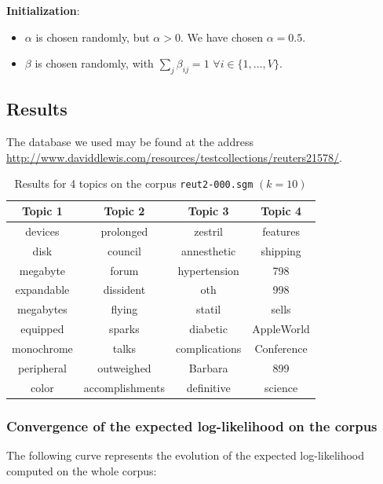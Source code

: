 \documentclass{article}
\begin{document}
\textbf{Initialization}:
\begin{itemize}
\setlength\itemsep{-0.2em}
  \item $\alpha$ is chosen randomly, but $\alpha > 0$. We have chosen $\alpha = 0.5$.
  \item $\beta$ is chosen randomly, with $\sum_{j} \beta_{ij} = 1$ $\forall i \in \{1, \ldots, V\}$.
\end{itemize}

\subsection{Results}

The database we used may be found at the address \url{http://www.daviddlewis.com/resources/testcollections/reuters21578/}.

\begin{table}[ht!]
\begin{center}
\begin{tabular}{c c c c}
\hline
\textbf{Topic 1} & \textbf{Topic 2} & \textbf{Topic 3}  & \textbf{Topic 4}\\
\hline
devices & prolonged & zestril & features \\
disk & council & annesthetic &  shipping  \\
megabyte & forum & hypertension & 798  \\
expandable & dissident & oth & 998  \\
megabytes & flying & statil & sells  \\
equipped &  sparks & diabetic & AppleWorld  \\
monochrome &talks & complications & Conference  \\
peripheral & outweighed & Barbara & 899  \\
color & accomplishments & definitive & science  \\
\hline
\end{tabular}
\caption{Results for 4 topics on the corpus \texttt{reut2-000.sgm} $(k=10)$}
\end{center}
\end{table}

\subsubsection*{Convergence of the expected log-likelihood on the corpus}

The following curve represents the evolution of the expected log-likelihood computed on the whole corpus:
\end{document}
